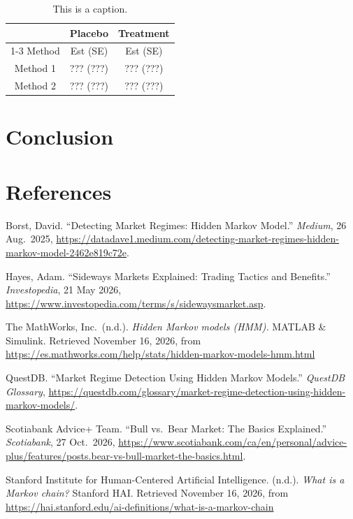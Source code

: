 \documentclass[
]{article}
\begin{document}
\begin{table}[!htp]
\small
\caption{This is a caption.}
\begin{center}
\begin{tabular}{|c|cc|}
\hline
& {Placebo}   &  {Treatment}       \\ \cline{1-3}  
Method& {Est} (SE)    &{Est} (SE) \\    %
\hline
\scriptsize{Method 1 } & ??? (???)     & ??? (???)      \\   %
\scriptsize{Method 2}  &  ??? (???)     &  ??? (???)     \\  %
\hline
\end{tabular}
\label{tab: 2.3}
\end{center}
\end{table}

\section{Conclusion}\label{conclusion}

\section{References}\label{references}

Borst, David. ``Detecting Market Regimes: Hidden Markov Model.''
\emph{Medium}, 26 Aug.~2025,
\url{https://datadave1.medium.com/detecting-market-regimes-hidden-markov-model-2462e819c72e}.

Hayes, Adam. ``Sideways Markets Explained: Trading Tactics and
Benefits.'' \emph{Investopedia}, 21 May 2026,
\url{https://www.investopedia.com/terms/s/sidewaysmarket.asp}.

The MathWorks, Inc.~(n.d.). \emph{Hidden Markov models (HMM).} MATLAB \&
Simulink. Retrieved November 16, 2026, from
\url{https://es.mathworks.com/help/stats/hidden-markov-models-hmm.html}

QuestDB. ``Market Regime Detection Using Hidden Markov Models.''
\emph{QuestDB Glossary},
\url{https://questdb.com/glossary/market-regime-detection-using-hidden-markov-models/}.

Scotiabank Advice+ Team. ``Bull vs.~Bear Market: The Basics Explained.''
\emph{Scotiabank}, 27 Oct.~2026,
\url{https://www.scotiabank.com/ca/en/personal/advice-plus/features/posts.bear-vs-bull-market-the-basics.html}.

Stanford Institute for Human-Centered Artificial Intelligence. (n.d.).
\emph{What is a Markov chain?} Stanford HAI. Retrieved November 16,
2026, from
\url{https://hai.stanford.edu/ai-definitions/what-is-a-markov-chain}
\end{document}
